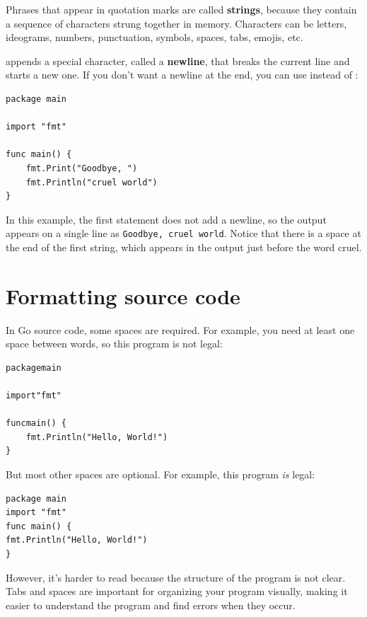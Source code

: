 
Phrases that appear in quotation marks are called {\bf strings}, because they contain a sequence of characters strung together in memory.
Characters can be letters, ideograms, numbers, punctuation, symbols, spaces, tabs, emojis, etc.


 appends a special character, called a {\bf newline}, that breaks the current line and starts a new one.
If you don't want a newline at the end, you can use  instead of :

\begin{lstlisting}
package main

import "fmt"

func main() {
	fmt.Print("Goodbye, ")
	fmt.Println("cruel world")
}
\end{lstlisting}

\label{goodbye}

In this example, the first statement does not add a newline, so the output appears on a single line as {\tt Goodbye, cruel world}.
Notice that there is a space at the end of the first string, which appears in the output just before the word cruel.


\section{Formatting source code}
\label{formatting}

In Go source code, some spaces are required.
For example, you need at least one space between words, so this program is not legal:

\begin{verbatim}
packagemain

import"fmt"

funcmain() {
	fmt.Println("Hello, World!") 
}
\end{verbatim}


But most other spaces are optional.
For example, this program {\em is} legal:

\begin{lstlisting}
package main
import "fmt"
func main() {
fmt.Println("Hello, World!") 
}
\end{lstlisting}

However, it's harder to read because the structure of the program is not clear.
Tabs and spaces are important for organizing your program visually, making it easier to understand the program and find errors when they occur.

